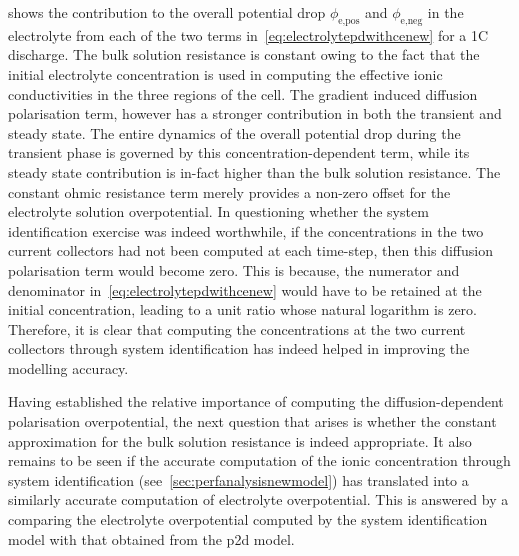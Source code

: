  shows the  contribution to the overall
potential drop  $\phi_\text{e,pos}$ and  $\phi_\text{e,neg}$ in  the electrolyte
from  each  of  the  two  terms  in~\cref{eq:electrolytepdwithcenew}  for  a  1C
discharge. The bulk  solution resistance is constant owing to  the fact that the
initial  electrolyte concentration  is  used in  computing  the effective  ionic
conductivities in the three regions of  the cell. The gradient induced diffusion
polarisation term, however has a stronger contribution in both the transient and
steady  state. The  entire dynamics  of the  overall potential  drop during  the
transient  phase is  governed by  this concentration-dependent  term, while  its
steady state contribution  is in-fact higher than the  bulk solution resistance.
The  constant  ohmic resistance  term  merely  provides  a non-zero  offset  for
the  electrolyte  solution  overpotential.  In questioning  whether  the  system
identification exercise was indeed worthwhile,  if the concentrations in the two
current collectors had not been computed  at each time-step, then this diffusion
polarisation  term  would  become  zero.  This is  because,  the  numerator  and
denominator in~\cref{eq:electrolytepdwithcenew} would have to be retained at the
initial concentration, leading to a unit  ratio whose natural logarithm is zero.
Therefore, it  is clear  that computing  the concentrations  at the  two current
collectors  through system  identification has  indeed helped  in improving  the
modelling accuracy.

Having established the relative  importance of computing the diffusion-dependent
polarisation   overpotential,  the   next  question   that  arises   is  whether
the   constant    approximation   for   the   bulk    solution   resistance   is
indeed   appropriate.   It  also   remains   to   be   seen  if   the   accurate
computation   of  the   ionic   concentration   through  system   identification
(see~\cref{sec:perfanalysisnewmodel}) has  translated into a  similarly accurate
computation of  electrolyte overpotential. This  is answered by a  comparing the
electrolyte overpotential computed by the  system identification model with that
obtained from the \gls{p2d} model.

